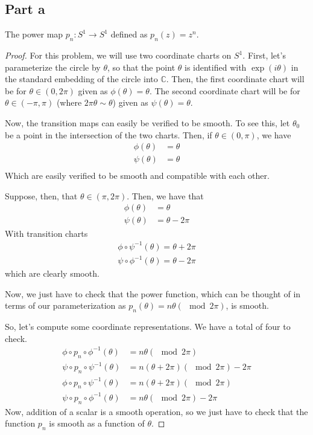 \documentclass[fontsize=11pt]{scrartcl} %
\numberwithin{equation}{section} %
\numberwithin{figure}{section} %
\numberwithin{table}{section} %
\newcommand{\C}{\mathbb{C}}
\begin{document}
\subsection*{Part a}
The power map $p_n:S^1\to S^1$ defined as $p_n(z) = z^n$.
\\
\begin{proof}
For this problem, we will use two coordinate charts on $S^1$. First, let's parameterize
the circle by $\theta$, so that the point $\theta$ is identified with $\exp(i\theta)$ in the
standard embedding of the circle into $\C$. Then, the first coordinate chart will be for
$\theta\in(0,2\pi)$ given as $\phi(\theta) = \theta$. The second coordinate chart will
be for $\theta\in(-\pi,\pi)$ (where $2\pi\theta \sim\theta$) given as $\psi(\theta) = \theta$.

Now, the transition maps can easily be verified to be smooth. To see this, let $\theta_0$
be a point in the intersection of the two charts. Then, if $\theta\in(0,\pi)$, we have
\[
\begin{aligned}
\phi(\theta) &= \theta\\
\psi(\theta) &= \theta\\
\end{aligned}
\]
Which are easily verified to be smooth and compatible with each other.

Suppose, then, that $\theta\in (\pi,2\pi)$. Then, we have that
\[
\begin{aligned}
\phi(\theta) &= \theta\\
\psi(\theta) &= \theta - 2\pi
\end{aligned}
\]
With transition charts
\[
\begin{aligned}
\phi\circ\psi^{-1}(\theta) = \theta + 2\pi\\
\psi\circ\phi^{-1}(\theta) = \theta - 2\pi
\end{aligned}
\]
which are clearly smooth.

Now, we just have to check that the power function, which can be thought of in terms of
our parameterization as $p_n(\theta) = n\theta (\mod 2\pi)$, is smooth.

So, let's compute some coordinate representations. We have a total of four to check.
\[
\begin{aligned}
\phi\circ p_n\circ\phi^{-1}(\theta) &= n\theta (\mod 2\pi)\\
\psi\circ p_n\circ\psi^{-1}(\theta) &= n(\theta+2\pi)  (\mod 2\pi)- 2\pi\\
\phi\circ p_n\circ\psi^{-1}(\theta) &= n(\theta +2\pi) (\mod 2\pi)\\
\psi\circ p_n\circ\phi^{-1}(\theta) &= n\theta  (\mod 2\pi)- 2\pi
\end{aligned}
\]
Now, addition of a scalar is a smooth operation, so we just have to check that the
function $p_n$ is smooth as a function of $\theta$. 


\end{proof}
\end{document}
